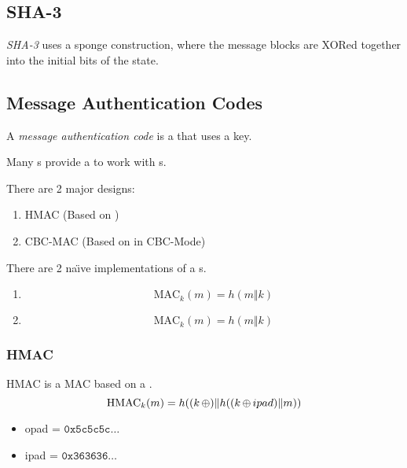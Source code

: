 \subsection{SHA-3}\label{subsec:SHA_3}
\begin{definition}[SHA-3]\label{def:SHA_3}
  \emph{SHA-3} uses a sponge construction, where the message blocks are XORed together into the initial bits of the state.
\end{definition}

\subsection{Message Authentication Codes}\label{subsec:MACs}
\begin{definition}\label{def:MAC}
  A \emph{message authentication code} is a  that uses a key.

  \begin{remark}\label{rmk:MAC_Block_Cipher_Relation}
    Many s provide a  to work with s.
  \end{remark}
\end{definition}

There are 2 major designs:
\begin{enumerate}[noitemsep]
\item HMAC (Based on )
\item CBC-MAC (Based on  in CBC-Mode)
\end{enumerate}

There are 2 na\"{\i}ve implementations of a s.
\begin{enumerate}[noitemsep]
\item
  \begin{equation*}
    \text{MAC}_{k}(m) = h(m \Vert k)
  \end{equation*}
\item
  \begin{equation*}
    \text{MAC}_{k}(m) = h(m \Vert k)
  \end{equation*}
\end{enumerate}

\subsubsection{HMAC}\label{subsubsec:HMAC}
HMAC is a MAC based on a .
\begin{equation}\label{eq:HMAC}
  \text{HMAC}_{k}(m) = h((k \operatorname{\oplus}) \Vert h((k \operatorname{\oplus} ipad) \Vert m))
\end{equation}
\begin{itemize}[noitemsep]
\item opad = $\mathtt{0x5c5c5c} \ldots$
\item ipad = $\mathtt{0x363636} \ldots$
\end{itemize}

